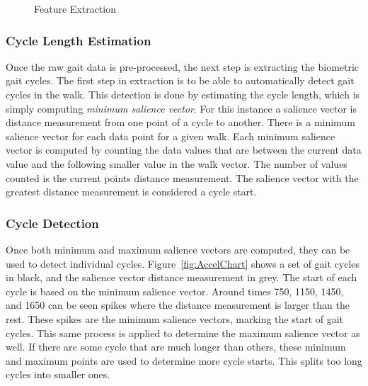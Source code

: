 \documentclass{sig-alternate}
\begin{document}
\begin{figure}
\centering
{}
\caption{Feature Extraction}
\label{fig:SecondStep}
\end{figure}

\subsubsection{Cycle Length Estimation}
Once the raw gait data is pre-processed, the next step is extracting the biometric gait cycles. The first step in extraction is to be able to automatically detect gait cycles in the walk. This detection is done by estimating the cycle length, which is simply computing \textit{minimum salience vector}. For this instance a salience vector is distance measurement from one point of a cycle to another. There is a minimum salience vector for each data point for a given walk. Each minimum salience vector is computed by counting the data values that are between the current data value and the following smaller value in the walk vector. The number of values counted is the current points distance measurement. The salience vector with the greatest distance measurement is considered a cycle start. 
\subsubsection{Cycle Detection}
Once both minimum and maximum salience vectors are computed, they can be used to detect individual cycles. Figure~\ref{fig:AccelChart} shows a set of gait cycles in black, and the salience vector distance measurement in grey. The start of each cycle is based on the minimum salience vector. Around times 750, 1150, 1450, and 1650 can be seen spikes where the distance measurement is larger than the rest. These spikes are the minimum salience vectors, marking the start of gait cycles. This same process is applied to determine the maximum salience vector as well. If there are some cycle that are much longer than others, these minimum and maximum points are used to determine more cycle starts. This splits too long cycles into smaller ones.

\begin{figure*}
\centering
{}
\caption{Minimum Salient Vectors}
\label{fig:AccelChart}
\end{figure*}
\end{document}
